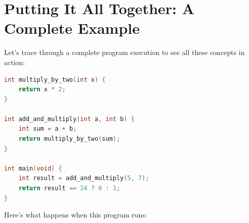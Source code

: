 \section{Putting It All Together: A Complete Example}

Let's trace through a complete program execution to see all these concepts in action:

\begin{lstlisting}[language=C]
int multiply_by_two(int x) {
    return x * 2;
}

int add_and_multiply(int a, int b) {
    int sum = a + b;
    return multiply_by_two(sum);
}

int main(void) {
    int result = add_and_multiply(5, 7);
    return result == 24 ? 0 : 1;
}
\end{lstlisting}

Here's what happens when this program runs:

